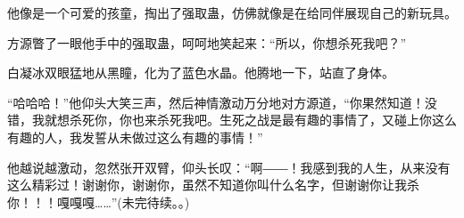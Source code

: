 \begin{this_body}
他像是一个可爱的孩童，掏出了强取蛊，仿佛就像是在给同伴展现自己的新玩具。

方源瞥了一眼他手中的强取蛊，呵呵地笑起来：“所以，你想杀死我吧？”

白凝冰双眼猛地从黑瞳，化为了蓝色水晶。他腾地一下，站直了身体。

“哈哈哈！”他仰头大笑三声，然后神情激动万分地对方源道，“你果然知道！没错，我就想杀死你，你也来杀死我吧。生死之战是最有趣的事情了，又碰上你这么有趣的人，我发誓从未做过这么有趣的事情！”

他越说越激动，忽然张开双臂，仰头长叹：“啊――！我感到我的人生，从来没有这么精彩过！谢谢你，谢谢你，虽然不知道你叫什么名字，但谢谢你让我杀你！！！嘎嘎嘎……”(未完待续。。)

\end{this_body}

